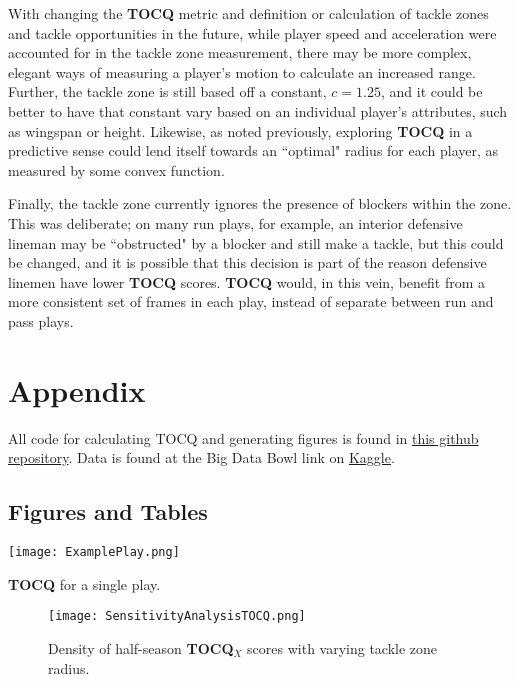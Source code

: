 \documentclass{article}
\begin{document}
With changing the \textbf{TOCQ} metric and definition or calculation of tackle zones and tackle opportunities in the future, while player speed and acceleration were accounted for in the tackle zone measurement, there may be more complex, elegant ways of measuring a player's motion to calculate an increased range. Further, the tackle zone is still based off a constant, $c = 1.25$, and it could be better to have that constant vary based on an individual player's attributes, such as wingspan or height. Likewise, as noted previously, exploring \textbf{TOCQ} in a predictive sense could lend itself towards an ``optimal" radius for each player, as measured by some convex function.

Finally, the tackle zone currently ignores the presence of blockers within the zone. This was deliberate; on many run plays, for example, an interior defensive lineman may be ``obstructed" by a blocker and still make a tackle, but this could be changed, and it is possible that this decision is part of the reason defensive linemen have lower \textbf{TOCQ} scores. \textbf{TOCQ} would, in this vein, benefit from a more consistent set of frames in each play, instead of separate between run and pass plays.

\printbibliography

\section{Appendix}

All code for calculating TOCQ and generating figures is found in \href{https://github.com/elignesin/Big-Data-Bowl-2024/}{this github repository}. Data is found at the Big Data Bowl link on \href{https://www.kaggle.com/competitions/nfl-big-data-bowl-2024/data}{Kaggle}.

\subsection{Figures and Tables}

\begin{table}[H]
    \centering
    \texttt{[image: ExamplePlay.png]}
    \caption{\textbf{TOCQ} for a single play.}
    \label{table:ExamplePlay}
\end{table}

\begin{figure}[H]
    \centering
    \texttt{[image: SensitivityAnalysisTOCQ.png]}
    \caption{Density of half-season \textbf{TOCQ$_X$} scores with varying tackle zone radius.}
    \label{fig:SensitivityAnalysisTOCQ}
\end{figure}
\end{document}
